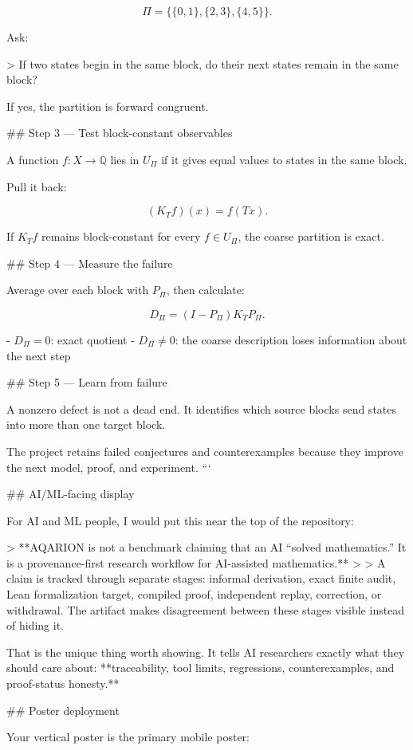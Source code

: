 \[
\Pi=\{\{0,1\},\{2,3\},\{4,5\}\}.
\]

Ask:

> If two states begin in the same block, do their next states remain in the same block?

If yes, the partition is forward congruent.

## Step 3 — Test block-constant observables

A function \(f:X\to\mathbb Q\) lies in \(U_\Pi\) if it gives equal values to states in the same block.

Pull it back:

\[
(K_Tf)(x)=f(Tx).
\]

If \(K_Tf\) remains block-constant for every \(f\in U_\Pi\), the coarse partition is exact.

## Step 4 — Measure the failure

Average over each block with \(P_\Pi\), then calculate:

\[
D_\Pi=(I-P_\Pi)K_TP_\Pi.
\]

- \(D_\Pi=0\): exact quotient
- \(D_\Pi\neq0\): the coarse description loses information about the next step

## Step 5 — Learn from failure

A nonzero defect is not a dead end. It identifies which source blocks send states into more than one target block.

The project retains failed conjectures and counterexamples because they improve the next model, proof, and experiment.
```

## AI/ML-facing display

For AI and ML people, I would put this near the top of the repository:

> **AQARION is not a benchmark claiming that an AI “solved mathematics.” It is a provenance-first research workflow for AI-assisted mathematics.**  
>  
> A claim is tracked through separate stages: informal derivation, exact finite audit, Lean formalization target, compiled proof, independent replay, correction, or withdrawal. The artifact makes disagreement between these stages visible instead of hiding it.

That is the unique thing worth showing. It tells AI researchers exactly what they should care about: **traceability, tool limits, regressions, counterexamples, and proof-status honesty.**

## Poster deployment

Your vertical poster is the primary mobile poster:

